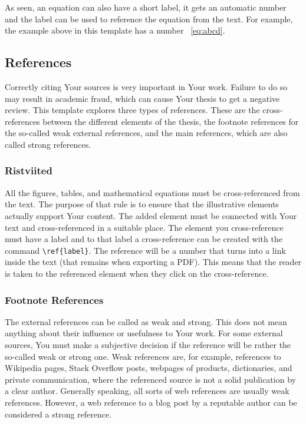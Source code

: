 As seen, an equation can also have a short label, it gets an automatic number and the label can be used to reference the equation from the text. For example, the example above in this template has a number ~\ref{eq:abcd}.

\subsection{References}
Correctly citing Your sources is very important in Your work. Failure to do so may result in academic fraud, which can cause Your thesis to get a negative review. This template explores three types of references. These are the cross-references between the different elements of the thesis, the footnote references for the so-called weak external references, and the main references, which are also called strong references.

\subsubsection{Ristviited}
All the figures, tables, and mathematical equations must be cross-referenced from the text. The purpose of that rule is to ensure that the illustrative elements actually support Your content.  The added element must be connected with Your text and cross-referenced in a suitable place. The element you cross-reference must have a label and to that label a cross-reference can be created with the command \verb|\ref{label}|. The reference will be a number that turns into a link inside the text (that remains when exporting a PDF). This means that the reader is taken to the referenced element when they click on the cross-reference.

\subsubsection{Footnote References}
The external references can be called as weak and strong. This does not mean anything about their influence or usefulness to Your work. For some external sources, You must make a subjective decision if the reference will be rather the so-called weak or strong one. Weak references are, for example, references to Wikipedia pages, Stack Overflow posts, webpages of products, dictionaries, and private communication, where the referenced source is not a solid publication by a clear author. Generally speaking, all sorts of web references are usually weak references. However, a web reference to a blog post by a reputable author can be considered a strong reference.

